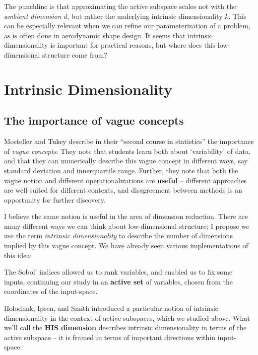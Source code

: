 \documentclass{article}
\begin{document}
The punchline is that approximating the active subspace scales not with the
\emph{ambient dimension} $d$, but rather the underlying intrinsic dimensionality
$k$. This can be especially relevant when we can refine our parameterization of
a problem, as is often done in aerodynamic shape design.\cite{economon2016su2}
It seems that intrinsic dimensionality is important for practical reasons, but
where does this low-dimensional structure come from?

\section{Intrinsic Dimensionality}

\subsection{The importance of vague concepts}
Mosteller and Tukey\cite{mosteller1977data} describe in their ``second course in
statistics'' the importance of \emph{vague concepts}. They note that students
learn both about `variability' of data, and that they can numerically describe
this vague concept in different ways, say standard deviation and innerquartile
range. Further, they note that both the vague notion and different
operationalizations are \textbf{useful} -- different approaches are well-suited
for different contexts, and disagreement between methods is an opportunity for
further discovery.

I believe the same notion is useful in the area of dimension reduction. There
are many different ways we can think about low-dimensional structure; I propose
we use the term \emph{intrinsic dimensionality} to describe the number of
dimensions implied by this vague concept. We have already seen various
implementations of this idea:

\bigskip\noindent The Sobol' indices allowed us to rank variables, and enabled
us to fix some inputs, continuing our study in an \textbf{active set} of
variables, chosen from the coordinates of the input-space.

\bigskip\noindent Holodnak, Ipsen, and Smith introduced a particular notion of
intrinsic dimensionality in the context of active subspaces, which we studied
above. What we'll call the \textbf{HIS dimension} describes intrinsic
dimensionality in terms of the active subspace -- it is framed in terms of
important directions within input-space.
\end{document}
